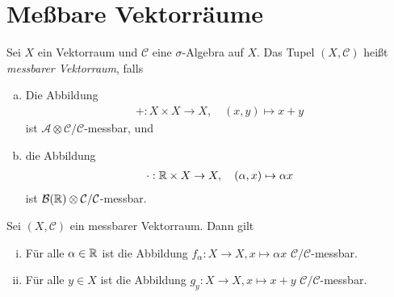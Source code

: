 \section{Meßbare Vektorräume}

\begin{mydef}
    Sei $X$ ein Vektorraum und $\mathcal{C}$ eine $\sigma$-Algebra auf $X$. Das Tupel $(X, \mathcal{C})$ heißt \textit{messbarer Vektorraum}, falls
    \begin{enumerate}[(a)]
        \item Die Abbildung 
        \begin{align*}
            + : X \times X \to X, \quad (x,y) \mapsto x + y
        \end{align*}
        ist $\mathcal{A}\otimes \mathcal{C}/\mathcal{C}$-messbar, und
        \item die Abbildung 
        \begin{align*}
            \cdot : \mathbb{R} \times X \to X, \quad  (\alpha, x) \mapsto \alpha x
        \end{align*}
        ist $\mathcal{B}(\mathbb{R}) \otimes \mathcal{C}/\mathcal{C}$-messbar. 
    \end{enumerate}
\end{mydef}

\begin{remark}
    Sei $(X, \mathcal{C})$ ein messbarer Vektorraum. Dann gilt
    \begin{enumerate}[(i)]
        \item Für alle $\alpha \in \mathbb{R}$ ist die Abbildung $f_{\alpha}: X \to X, x \mapsto \alpha x$ $\mathcal{C}/\mathcal{C}$-messbar. 
        \item Für alle $y \in X$ ist die Abbildung $g_y: X \to X, x \mapsto x + y$ $\mathcal{C}/\mathcal{C}$-messbar.
    \end{enumerate}
\end{remark}

